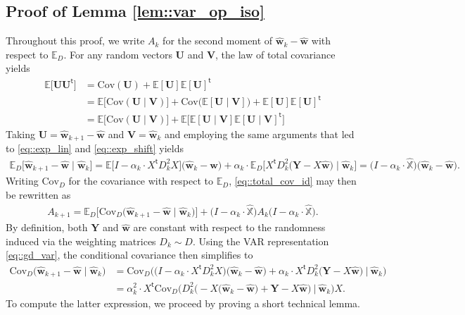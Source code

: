 \documentclass{article}
\newcommand*{\E}{\mathbb{E}} %
\newcommand*{\bbX}{\mathbb{X}}
\newcommand*{\bfU}{\mathbf{U}}
\newcommand*{\bfV}{\mathbf{V}}
\newcommand*{\bfY}{\mathbf{Y}}
\newcommand*{\bfw}{\mathbf{w}}
\newcommand*{\tran}{^{\mathsf{t}}}
\newcommand*{\bigmid}{\ \big\vert\ }
\newcommand*{\Cov}{\mathrm{Cov}}
\newcommand{\whweight}{\widehat{\bfw}}
\newcommand{\whbbX}{\widehat{\bbX}}
\begin{document}
\subsection{Proof of Lemma \ref{lem::var_op_iso}}

Throughout this proof, we write $A_k$ for the second moment of $\whweight_k -
\whweight$ with respect to $\E_D$. For any random vectors $\bfU$ and $\bfV$, the
law of total covariance yields \begin{align}
  \E\big[\bfU \bfU\tran\big] &= \Cov(\bfU) + \E[\bfU] \E[\bfU]\tran \nonumber\\
  &= \E\big[\Cov(\bfU \mid \bfV)\big] + \Cov\big(\E[\bfU \mid \bfV]\big) +
  \E[\bfU] \E[\bfU]\tran \nonumber\\
  &= \E\big[\Cov(\bfU \mid \bfV)\big] + \E\big[\E[\bfU \mid \bfV] \E[\bfU \mid
  \bfV]\tran\big] \label{eq::total_cov_id}
\end{align} Taking $\bfU = \whweight_{k + 1} - \whweight$ and $\bfV =
\whweight_k$ and employing the same arguments that led to \eqref{eq::exp_lin}
and \eqref{eq::exp_shift} yields \begin{align*}
  \E_D\big[\whweight_{k + 1} - \whweight \mid \whweight_k\big] = \E\big[I -
  \alpha_k \cdot X\tran D_k^2 X\big] \big(\whweight_k - \whweight\big) +
  \alpha_k \cdot \E_D\big[X\tran D_k^2 \big(\bfY - X \whweight\big) \mid
  \whweight_k \big] = \big(I - \alpha_k \cdot \whbbX\big) \big(\whweight_k -
  \whweight\big).
\end{align*} Writing $\Cov_D$ for the covariance with respect to $\E_D$,
\eqref{eq::total_cov_id} may then be rewritten as \begin{align}
  \label{eq::var_rec_cond}
  A_{k + 1} = \E_D\Big[\Cov_D\big(\whweight_{k + 1} - \whweight \mid
  \whweight_k\big)\Big] + \big(I - \alpha_k \cdot \whbbX\big) A_k \big(I -
  \alpha_k \cdot \whbbX\big).
\end{align} By definition, both $\bfY$ and $\whweight$ are constant with respect
to the randomness induced via the weighting matrices $D_k \sim D$. Using the VAR
representation \eqref{eq::gd_var}, the conditional covariance then simplifies to
\begin{align}
  \Cov_D\big(\whweight_{k + 1} - \whweight \mid \whweight_k\big) &=
  \Cov_D\Big(\big(I - \alpha_k \cdot X\tran D_k^2 X\big) \big(\whweight_k -
  \whweight\big) + \alpha_k \cdot X\tran D_k^2 \big(\bfY - X \whweight\big)
  \bigmid \whweight_k\Big) \nonumber\\
  &= \alpha_k^2 \cdot X\tran \Cov_D\bigg( D_k^2 \Big( - X \big(\whweight_k -
  \whweight\big) + \bfY - X \whweight\Big) \bigmid \whweight_k\bigg) X.
  \label{eq::cov_cond}
\end{align} To compute the latter expression, we proceed by proving a short
technical lemma.
\end{document}
